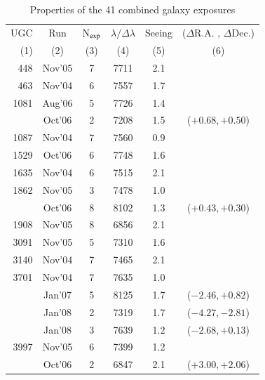 \begin{table}
\caption{\label{tab:UGC_comb}
Properties of the 41 combined galaxy exposures}
\centering
%
{\small
\begin{tabular}{|r c c c c c|}
\hline
  UGC  & Run   & N$_{\rm exp}$  & $\lambda/\Delta\lambda$ &  Seeing & ($\Delta$R.A. , $\Delta$Dec.) \\
  (1)  &    (2)     &  (3) &  (4)   &  (5)  &          (6)      \\
\hline
  448  &  Nov\hfill '05   &    7 &  7711  &   2.1 &                   \\
  463  &  Nov\hfill '04   &    6 &  7557  &   1.7 &                   \\
 1081  &  Aug\hfill '06   &    5 &  7726  &   1.4 &                   \\
       &  Oct\hfill '06   &    2 &  7208  &   1.5 & ($+0.68 , +0.50$) \\
 1087  &  Nov\hfill '04   &    7 &  7560  &   0.9 &                   \\
 1529  &  Oct\hfill '06   &    6 &  7748  &   1.6 &                   \\
 1635  &  Nov\hfill '04   &    6 &  7515  &   2.1 &                   \\
 1862  &  Nov\hfill '05   &    3 &  7478  &   1.0 &                   \\
       &  Oct\hfill '06   &    8 &  8102  &   1.3 & ($+0.43 , +0.30$) \\
 1908  &  Nov\hfill '05   &    8 &  6856  &   2.1 &                   \\
 3091  &  Nov\hfill '05   &    5 &  7310  &   1.6 &                   \\
 3140  &  Nov\hfill '04   &    7 &  7465  &   2.1 &                   \\
 3701  &  Nov\hfill '04   &    7 &  7635  &   1.0 &                   \\
       &  Jan\hfill '07   &    5 &  8125  &   1.7 & ($-2.46 , +0.82$) \\
       &  Jan\hfill '08   &    2 &  7319  &   1.7 & ($-4.27 , -2.81$) \\
       &  Jan\hfill '08   &    3 &  7639  &   1.2 & ($-2.68 , +0.13$) \\
 3997  &  Nov\hfill '05   &    6 &  7399  &   1.2 &                   \\
       &  Oct\hfill '06   &    2 &  6847  &   2.1 & ($+3.00 , +2.06$) \\

\end{tabular}}
\end{table}
